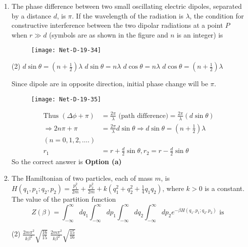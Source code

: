 \begin{enumerate}
\item The phase difference between two small oscillating electric dipoles, separated by a distance $d$, is $\pi$. If the wavelength of the radiation is $\lambda$, the condition for constructive interference between the two dipolar radiations at a point $P$ when $r \gg d$ (symbols are as shown in the figure and $n$ is an integer) is
\begin{figure}[H]
	\centering
	\texttt{[image: Net-D-19-34]}
\end{figure}
 \begin{tasks}(2)
	\task[\textbf{a.}] $d \sin \theta=\left(n+\frac{1}{2}\right) \lambda$
	\task[\textbf{b.}]$d \sin \theta=n \lambda$
	\task[\textbf{c.}]$d \cos \theta=n \lambda$
	\task[\textbf{d.}]  $d \cos \theta=\left(n+\frac{1}{2}\right) \lambda$
\end{tasks}
\begin{answer}
 Since dipole are in opposite direction, initial phase change will be $\pi$.
 \begin{figure}[H]
 	\centering
 	\texttt{[image: Net-D-19-35]}
 \end{figure}
	\begin{align*}
	\text{Thus }
	(\Delta \phi+\pi)&=\frac{2 \pi}{\lambda}\text{ (path difference)}
	 =\frac{2 \pi}{\lambda}(d \sin \theta)\\
	\Rightarrow 2 n \pi+\pi&=\frac{2 \pi}{\lambda} d \sin \theta \Rightarrow d \sin \theta=\left(n+\frac{1}{2}\right) \lambda\\
	(n=0,1,2, \ldots .)&\\
	r_{1}&=r+\frac{d}{2} \sin \theta, r_{2}=r-\frac{d}{2} \sin \theta
	\end{align*}
	So the correct answer is \textbf{Option (a)}
\end{answer}
\item The Hamiltonian of two particles, each of mass $m$, is $H\left(q_{1}, p_{1} ; q_{2}, p_{2}\right)=\frac{p_{1}^{2}}{2 m}+\frac{p_{2}^{2}}{2 m}+k\left(q_{1}^{2}+q_{2}^{2}+\frac{1}{4} q_{1} q_{2}\right)$, where $k>0$ is a constant. The value of the partition function
$$
Z(\beta)=\int_{-\infty}^{\infty} d q_{1} \int_{-\infty}^{\infty} d p_{1} \int_{-\infty}^{\infty} d q_{2} \int_{-\infty}^{\infty} d p_{2} e^{-\beta H\left(q_{1}, p_{1} ; q_{2}, p_{2}\right)} \text { is }
$$
 \begin{tasks}(2)
	\task[\textbf{a.}] $\frac{2 m \pi^{2}}{k \beta^{2}} \sqrt{\frac{16}{15}}$
	\task[\textbf{b.}]$\frac{2 m \pi^{2}}{k \beta^{2}} \sqrt{\frac{15}{16}}$

\end{tasks}
\end{enumerate}

